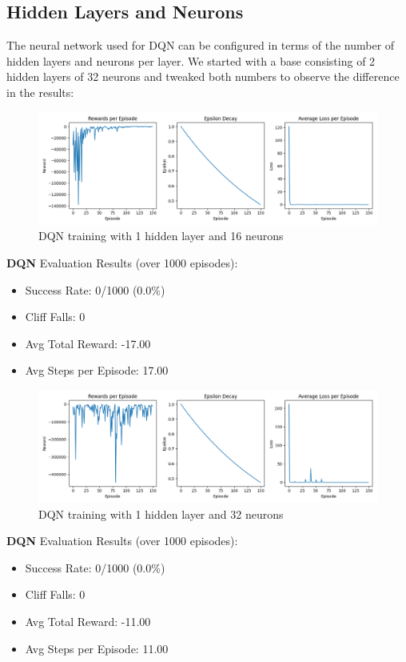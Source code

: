\documentclass[a4paper,12pt]{article}
\begin{document}
\subsection{Hidden Layers and Neurons}
The neural network used for DQN can be configured in terms of the number of hidden layers and neurons per layer.
We started with a base consisting of 2 hidden layers of 32 neurons and tweaked both numbers to observe the difference in the results:\\
\begin{figure}[H]
    \centering
    \includegraphics[width=\linewidth]{1_16.png}
    \caption{DQN training with 1 hidden layer and 16 neurons}
\end{figure}
\textbf{DQN} Evaluation Results (over 1000 episodes):
\begin{itemize}
    \item Success Rate: 0/1000 (0.0\%)
    \item Cliff Falls: 0
    \item Avg Total Reward: -17.00
    \item Avg Steps per Episode: 17.00
\end{itemize}
\begin{figure}[H]
    \centering
    \includegraphics[width=\linewidth]{1_32.png}
    \caption{DQN training with 1 hidden layer and 32 neurons}
\end{figure}
\textbf{DQN} Evaluation Results (over 1000 episodes):
\begin{itemize}
    \item Success Rate: 0/1000 (0.0\%)
    \item Cliff Falls: 0
    \item Avg Total Reward: -11.00
    \item Avg Steps per Episode: 11.00
\end{itemize}
\end{document}
